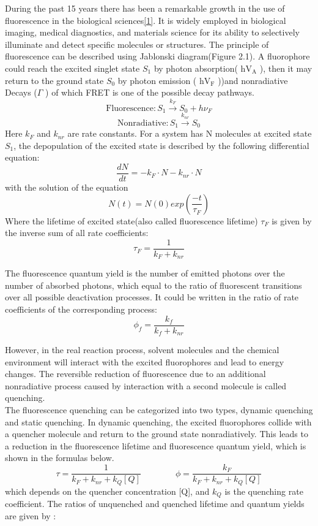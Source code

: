 \documentclass[a4paper,english,12pt,bibliography=totoc]{scrreprt}
\begin{document}
During the past 15 years there has been a remarkable growth in the use of fluorescence in the biological sciences\hyperref[sec:ref_1]{[1]}. It is widely employed in biological imaging, medical diagnostics, and materials science for its ability to selectively illuminate and detect specific molecules or structures. The principle of fluorescence can be described using Jablonski diagram(Figure 2.1). A fluorophore could reach the excited singlet state $S_1$ by photon absorption( $\mathrm{hV_A}$ ), then it may return to the ground state $S_0$ by photon emission ( $\mathrm{hV_F}$ ))and nonradiative Decays ($\Gamma$ ) of which FRET is one of the possible decay pathways. 
\[
\mathrm{Fluorescence}: S_1 \stackrel{k_F}{\longrightarrow} S_0 + h\nu_F
\]
\[
\mathrm{Nonradiative}: S_1 \stackrel{k_{nr}}{\longrightarrow} S_0
\]
Here $k_F$ and $k_{nr}$ are rate constants. For a system has N molecules at excited state $S_1$, the depopulation of the excited state is described by the following differential equation:
\[
\frac{dN}{dt} = -k_F\cdot N - k_{nr}\cdot N
\]
with the solution of the equation
\[
N(t) = N(0)exp(\frac{-t}{\tau_F})
\]
Where the lifetime of excited state(also called fluorescence lifetime) $\tau_F$ is given by the inverse sum of all rate coefficients:
\[
\tau_F = \frac{1}{k_F+k_{nr}}
\]

The fluorescence quantum yield is the number of emitted photons over the number of absorbed photons, which equal to the ratio of fluorescent transitions over all possible deactivation processes. It could be written in the ratio of rate coefficients of the corresponding process:
\[
\phi_f = \frac{k_f}{k_f+k_{nr}}
\]

However, in the real reaction process, solvent molecules and the chemical environment will interact with the excited fluorophores and lead to energy changes. The reversible reduction of fluorescence due to an additional nonradiative process caused by interaction with a second molecule is called quenching. \\

The fluorescence quenching can be categorized into two types, dynamic quenching and static quenching. In dynamic quenching, the excited fluorophores collide with a quencher molecule and return to the ground state nonradiatively. This leads to a reduction in the fluorescence lifetime and fluorescence quantum yield, which is shown in the formulas below.
\[
\tau = \frac{1}{k_F+k_{nr}+k_Q[Q]} \qquad \qquad   \phi = \frac{k_F}{k_F+k_{nr}+k_Q[Q]}
\]
which depends on the quencher concentration [Q], and $k_Q$ is the quenching rate coefficient. The ratios of unquenched and quenched lifetime and quantum yields are given by :
\end{document}
